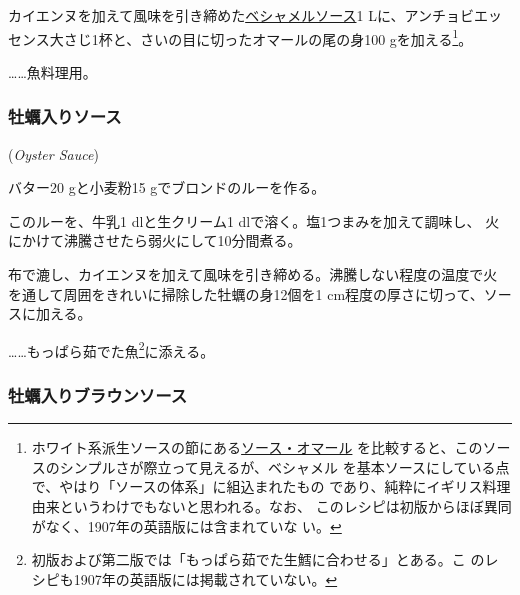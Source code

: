 \begin{recette}
カイエンヌを加えて風味を引き締めた\protect\hyperlink{sauce-bechamel}{ベシャメルソース}1
Lに、アンチョビエッセンス大さじ1杯と、さいの目に切ったオマールの尾の身100
gを加える\footnote{ホワイト系派生ソースの節にある\protect\hyperlink{sauce-homard}{ソース・オマール}
  を比較すると、このソースのシンプルさが際立って見えるが、ベシャメル
  を基本ソースにしている点で、やはり「ソースの体系」に組込まれたもの
  であり、純粋にイギリス料理由来というわけでもないと思われる。なお、
  このレシピは初版からほぼ異同がなく、1907年の英語版には含まれていな
  い。}。

\ldots{}\ldots{}魚料理用。

\maeaki

\hypertarget{oyster-sauce}{%
\subsubsection{牡蠣入りソース}\label{oyster-sauce}}

 (\emph{Oyster Sauce})


バター20 gと小麦粉15 gでブロンドのルーを作る。

このルーを、牛乳1 dlと生クリーム1 dlで溶く。塩1つまみを加えて調味し、
火にかけて沸騰させたら弱火にして10分間煮る。

布で漉し、カイエンヌを加えて風味を引き締める。沸騰しない程度の温度で火
を通して周囲をきれいに掃除した牡蠣の身12個を1 cm程度の厚さに切って、ソー
スに加える。

\ldots{}\ldots{}もっぱら茹でた魚\footnote{初版および第二版では「もっぱら茹でた生鱈に合わせる」とある。こ
  のレシピも1907年の英語版には掲載されていない。}に添える。

\maeaki

\hypertarget{brown-oyster-sauce}{%
\subsubsection{牡蠣入りブラウンソース}\label{brown-oyster-sauce}}


\end{recette}
